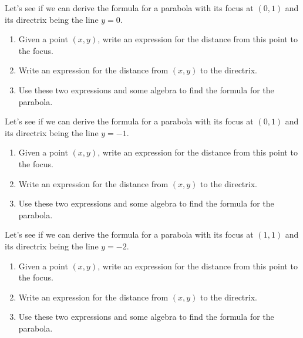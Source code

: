 \begin{prob}
Let's see if we can derive the formula for a parabola with its focus at $(0,1)$ and its directrix being the line $y=0$.
\begin{enumerate}
\item Given a point $(x,y)$, write an expression for the distance from this point to the focus.
\item Write an expression for the distance from $(x,y)$ to the directrix. 
\item Use these two expressions and some algebra to find the formula for the parabola. 
\end{enumerate}
\end{prob}

\begin{prob}
Let's see if we can derive the formula for a parabola with its focus at $(0,1)$ and its directrix being the line $y=-1$.
\begin{enumerate}
\item Given a point $(x,y)$, write an expression for the distance from this point to the focus.
\item Write an expression for the distance from $(x,y)$ to the directrix. 
\item Use these two expressions and some algebra to find the formula for the parabola. 
\end{enumerate}
\end{prob}


\begin{prob}
Let's see if we can derive the formula for a parabola with its focus at $(1,1)$ and its directrix being the line $y=-2$.
\begin{enumerate}
\item Given a point $(x,y)$, write an expression for the distance from this point to the focus.
\item Write an expression for the distance from $(x,y)$ to the directrix. 
\item Use these two expressions and some algebra to find the formula for the parabola. 
\end{enumerate}
\end{prob}



